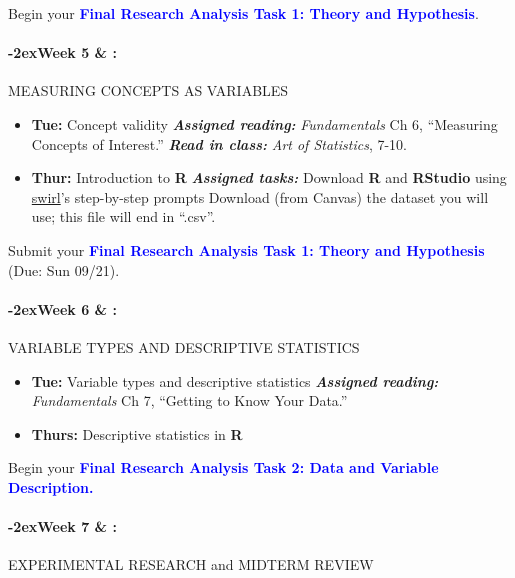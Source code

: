 \documentclass[11pt]{article}
\newcommand{\week}[1]{

  \paragraph*{\kern-2ex\quad #1 \AdvanceDate[1]\syldate{\today} \& \AdvanceDate[2]\syldate{\today} :}

  \ifdim\wd1=\wd\MONDAY
    \AdvanceDate[7]
  \else
    \AdvanceDate[7]
  \fi
}
\begin{document}
\noindent Begin your \textcolor{blue}{\textbf{Final Research Analysis Task 1: Theory and Hypothesis}}.

\week{Week 5} MEASURING CONCEPTS AS VARIABLES

\begin{itemize}
    \item []\textbf{Tue:} Concept validity
    \subitem \textbf{\textit{Assigned reading:}} \textit{Fundamentals} Ch 6, ``Measuring Concepts of Interest.''
    \subitem \textbf{\textit{Read in class:}} \textit{Art of Statistics}, 7-10.
    \item [] \textbf{Thur:} Introduction to \textbf{\textsf{R}}
        \subitem \textbf{\textit{Assigned tasks:}}
            \subsubitem Download \textbf{\textsf{R}} and \textbf{\textsf{RStudio}} using \href{https://swirlstats.com/students.htm}{swirl}'s step-by-step prompts
            \subsubitem Download (from Canvas) the dataset you will use; this file will end in ``.csv''.
\end{itemize}

\noindent Submit your \textcolor{blue}{\textbf{Final Research Analysis Task 1: Theory and Hypothesis}} (Due: Sun 09/21).

\week{Week 6} VARIABLE TYPES AND DESCRIPTIVE STATISTICS

\begin{itemize}
    \item [] \textbf{Tue:} Variable types and descriptive statistics
    \subitem \textbf{\textit{Assigned reading:}} \textit{Fundamentals} Ch 7, ``Getting to Know Your Data.''
    \item [] \textbf{Thurs:} Descriptive statistics in \textbf{\textsf{R}}
\end{itemize}

\noindent Begin your \textcolor{blue}{\textbf{Final Research Analysis Task 2: Data and Variable Description.}}

\week{Week 7} EXPERIMENTAL RESEARCH and MIDTERM REVIEW
\end{document}
